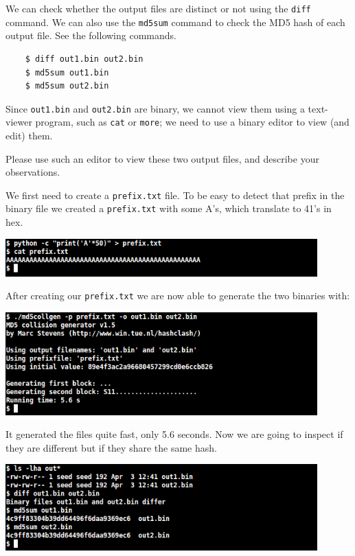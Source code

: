 \documentclass[a4paper]{article}
\begin{document}
We can check whether the output files are distinct or not using the \texttt{diff} command. We can also use the \texttt{md5sum} command to check the MD5 hash of each output file. See the following commands.

\begin{verbatim}
    $ diff out1.bin out2.bin
    $ md5sum out1.bin
    $ md5sum out2.bin
\end{verbatim}

Since \texttt{out1.bin} and \texttt{out2.bin} are binary, we cannot view them using a text-viewer program, such as \texttt{cat} or \texttt{more}; we need to use a binary editor to view (and edit) them.

Please use such an editor to view these two output files, and describe your observations.

We first need to create a \texttt{prefix.txt} file. To be easy to detect that prefix in the binary file we created a \texttt{prefix.txt} with some A's, which translate to 41's in hex.

\bigskip

\includegraphics[width=0.9\textwidth]{bash/prefix.png}

\bigskip

After creating our \texttt{prefix.txt} we are now able to generate the two binaries with:

\bigskip

\includegraphics[width=0.9\textwidth]{bash/md5collgenout.png}

\bigskip

It generated the files quite fast, only 5.6 seconds. Now we are going to inspect if they are different but if they share the same hash.

\bigskip

\includegraphics[width=0.9\textwidth]{bash/md5collgenoutcomp.png}
\end{document}
